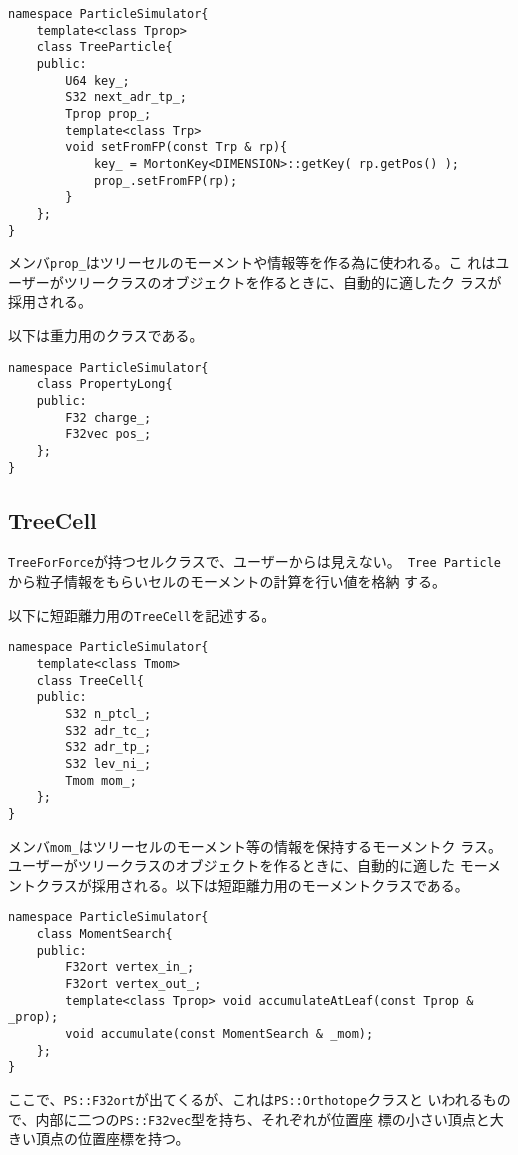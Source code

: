 \begin{lstlisting}[caption=TreeParticle]
namespace ParticleSimulator{
    template<class Tprop>
    class TreeParticle{
    public:
        U64 key_;
        S32 next_adr_tp_;
        Tprop prop_;
        template<class Trp>
        void setFromFP(const Trp & rp){
            key_ = MortonKey<DIMENSION>::getKey( rp.getPos() );
            prop_.setFromFP(rp);
        }
    };
}
\end{lstlisting}

メンバ{\tt prop\_}はツリーセルのモーメントや情報等を作る為に使われる。こ
れはユーザーがツリークラスのオブジェクトを作るときに、自動的に適したク
ラスが採用される。

以下は重力用のクラスである。

\begin{lstlisting}[caption=PropertyLong]
namespace ParticleSimulator{
    class PropertyLong{
    public:
        F32 charge_;
        F32vec pos_;
    };
}
\end{lstlisting}



\subsection{TreeCell}

{\tt TreeForForce}が持つセルクラスで、ユーザーからは見えない。{\tt
Tree Particle}から粒子情報をもらいセルのモーメントの計算を行い値を格納
する。

以下に短距離力用の{\tt TreeCell}を記述する。
\begin{lstlisting}[caption=TreeCell]
namespace ParticleSimulator{
    template<class Tmom>
    class TreeCell{
    public:
        S32 n_ptcl_;
        S32 adr_tc_;
        S32 adr_tp_;
        S32 lev_ni_;
        Tmom mom_;
    };
}
\end{lstlisting}


メンバ{\tt mom\_}はツリーセルのモーメント等の情報を保持するモーメントク
ラス。ユーザーがツリークラスのオブジェクトを作るときに、自動的に適した
モーメントクラスが採用される。以下は短距離力用のモーメントクラスである。

\begin{lstlisting}[caption=MomentSearch]
namespace ParticleSimulator{
    class MomentSearch{
    public:
        F32ort vertex_in_;
        F32ort vertex_out_;
        template<class Tprop> void accumulateAtLeaf(const Tprop & _prop);
        void accumulate(const MomentSearch & _mom);
    };
}
\end{lstlisting}

ここで、{\tt PS::F32ort}が出てくるが、これは{\tt PS::Orthotope}クラスと
いわれるもので、内部に二つの{\tt PS::F32vec}型を持ち、それぞれが位置座
標の小さい頂点と大きい頂点の位置座標を持つ。